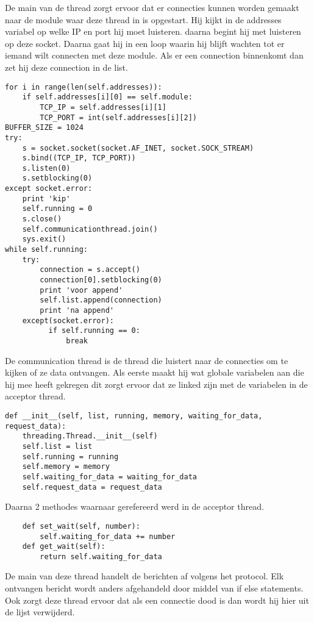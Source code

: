 \documentclass[a4paper,10pt]{article}
\begin{document}
De main van de thread zorgt ervoor dat er connecties kunnen worden gemaakt naar de module waar deze thread in is opgestart. Hij kijkt in de addresses variabel op welke IP en port hij moet luisteren. daarna begint hij met luisteren op deze socket. Daarna gaat hij in een loop waarin hij blijft wachten tot er iemand wilt connecten met deze module. Als er een connection binnenkomt dan zet hij deze connection in de list.
\begin{verbatim}
for i in range(len(self.addresses)):
    if self.addresses[i][0] == self.module:
        TCP_IP = self.addresses[i][1]
        TCP_PORT = int(self.addresses[i][2])
BUFFER_SIZE = 1024
try:
    s = socket.socket(socket.AF_INET, socket.SOCK_STREAM)
    s.bind((TCP_IP, TCP_PORT))
    s.listen(0)
    s.setblocking(0)
except socket.error:
    print 'kip'
    self.running = 0
    s.close()
    self.communicationthread.join()
    sys.exit()
while self.running:
    try:
        connection = s.accept()
        connection[0].setblocking(0)
        print 'voor append'
        self.list.append(connection)
        print 'na append'
    except(socket.error):
	      if self.running == 0:
	          break
\end{verbatim}
De communication thread is de thread die luistert naar de connecties om te kijken of ze data ontvangen. Als eerste maakt hij wat globale variabelen aan die hij mee heeft gekregen dit zorgt ervoor dat ze linked zijn met de variabelen in de acceptor thread.
\begin{verbatim}
def __init__(self, list, running, memory, waiting_for_data, request_data):
    threading.Thread.__init__(self)
    self.list = list
    self.running = running
    self.memory = memory
    self.waiting_for_data = waiting_for_data
    self.request_data = request_data
\end{verbatim}
Daarna 2 methodes waarnaar gerefereerd werd in de acceptor thread. %
\begin{verbatim}
    def set_wait(self, number):
        self.waiting_for_data += number
    def get_wait(self):
        return self.waiting_for_data
\end{verbatim}
De main van deze thread handelt de berichten af volgens het protocol. Elk ontvangen bericht wordt anders afgehandeld door middel van if else statements. Ook zorgt deze thread ervoor dat als een connectie dood is dan wordt hij hier uit de lijst verwijderd.
\end{document}
